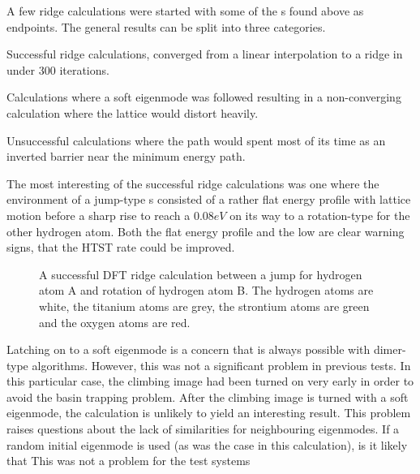 A few ridge calculations were started with some of the s found above as endpoints.
The general results can be split into three categories.
\bit
\item Successful ridge calculations, converged from a linear interpolation to a ridge in under 300 iterations.
\item Calculations where a soft eigenmode was followed resulting in a non-converging calculation where the lattice would distort heavily.
\item Unsuccessful calculations where the path would spent most of its time as an inverted barrier near the minimum energy path.
\eit

The most interesting of the successful ridge calculations was one where the environment of a jump-type s consisted of a rather flat energy profile with lattice motion before a sharp rise to reach a $0.08\unit{eV}$  on its way to a rotation-type  for the other hydrogen atom.
Both the flat energy profile and the low  are clear warning signs, that the HTST rate could be improved.
\begin{figure}[htb]
\begin{center}
    \parbox{0.85\linewidth}{
      \caption{A successful DFT ridge calculation between a jump  for hydrogen atom A and rotation of hydrogen atom B.
The hydrogen atoms are white, the titanium atoms are grey, the strontium atoms are green and the oxygen atoms are red.
      }
      \label{fig:semi-results}
    }
\end{center}
\end{figure}


Latching on to a soft eigenmode is a concern that is always possible with dimer-type algorithms.
However, this was not a significant problem in previous tests.
In this particular case, the climbing image had been turned on very early in order to avoid the basin trapping problem.
After the climbing image is turned with a soft eigenmode, the calculation is unlikely to yield an interesting result.
This problem raises questions about the lack of similarities for neighbouring eigenmodes.
If a random initial eigenmode is used (as was the case in this calculation), is it likely that \expand
This was not a problem for the test systems

